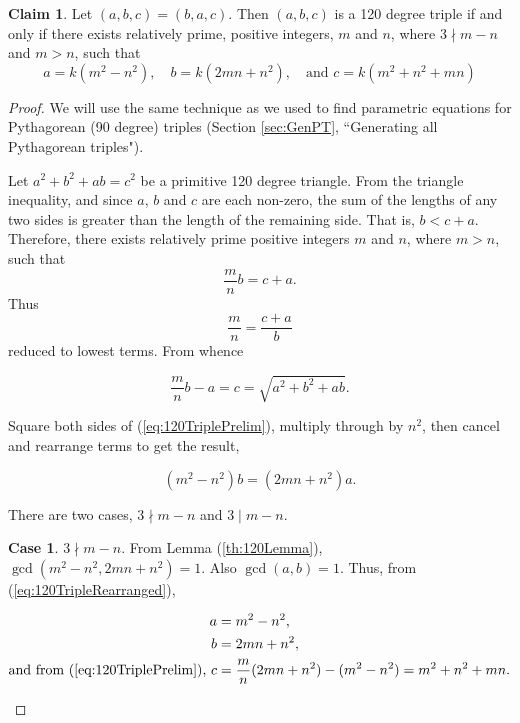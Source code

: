 \documentclass{article}
\theoremstyle{definition}
\newtheorem{claim}{Claim}
\newtheorem{case}{Case}[section]
\begin{document}
\begin{claim}
Let \((a,b,c)=(b,a,c)\). Then \((a,b,c)\) is a 120 degree triple if and only if there exists relatively prime, positive integers, \(m\) and \(n\), where \(3\nmid m-n\) and \(m > n\), such that \[ a=k(m^2-n^2), \quad b=k(2mn+n^2), \quad\text{and } c=k(m^2+n^2+mn) \]
\end{claim}
\begin{proof}
We will use the same technique as we used to find parametric equations for Pythagorean (90 degree) triples (Section \ref{sec:GenPT}, ``Generating all Pythagorean triples").

Let \(a^2+b^2+ab=c^2\) be a primitive 120 degree triangle. From the triangle inequality, and since \(a\), \(b\) and \(c\) are each non-zero, the sum of the lengths of any two sides is greater than the length of the remaining side. That is, \(b<c+a\). Therefore, there exists relatively prime positive integers \(m\) and \(n\), where \(m > n\), such that \[ \frac{m}{n} b=c+a.\]
Thus \[\frac{m}{n}=\frac{c+a}{b}\] reduced to lowest terms. From whence

\begin{equation}
\frac{m}{n} b-a=c=\sqrt{a^2+b^2+ab}.
\label{eq:120TriplePrelim}
\end{equation}

Square both sides of (\ref{eq:120TriplePrelim}), multiply through by \(n^2\), then cancel and rearrange terms to get the result,

\begin{equation}
(m^2-n^2)b=(2mn+n^2)a.
\label{eq:120TripleRearranged}
\end{equation}

There are two cases, \(3\nmid m-n\) and \(3\mid m-n\).
\begin{case}
\({3\nmid m-n}\). From Lemma (\ref{th:120Lemma}), \(\gcd(m^2-n^2,2mn+n^2)=1\). Also \(\gcd(a,b)= 1\). Thus, from (\ref{eq:120TripleRearranged}),

\begin{equation}
\begin{aligned}
a &= m^2 - n^2, \\
b &= 2mn + n^2, \\
\text{and from (\ref{eq:120TriplePrelim}), } c &= \frac{m}{n}(2mn + n^2) - (m^2 - n^2) = m^2 + n^2 + mn.
\end{aligned}
\label{eq:120TripleCase1}
\end{equation}
\end{case}


\end{proof}
\end{document}
